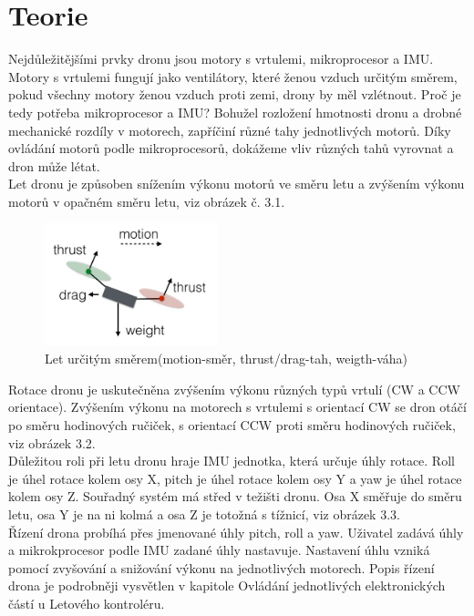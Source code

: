 \chapter{Teorie}
\label{2-teorie}

Nejdůležitějšími prvky dronu jsou motory s vrtulemi, mikroprocesor a IMU. Motory s vrtulemi fungují jako ventilátory, které ženou vzduch určitým směrem, pokud všechny motory ženou vzduch proti zemi, drony by měl vzlétnout. Proč je tedy potřeba mikroprocesor a IMU? Bohužel rozložení hmotnosti dronu a drobné mechanické rozdíly v motorech, zapříčiní různé tahy jednotlivých motorů. Díky ovládání motorů podle mikroprocesorů, dokážeme vliv různých tahů vyrovnat a dron může létat.\\
Let dronu je způsoben snížením výkonu motorů ve směru letu a zvýšením výkonu motorů v opačném směru letu, viz obrázek č. 3.1.\\
\begin{figure}[h]
	\centering
	\includegraphics[width=5cm]{pictures/dronfly.jpg}
	\caption{Let určitým směrem(motion-směr, thrust/drag-tah, weigth-váha)}
\end{figure}
 Rotace dronu je uskutečněna zvýšením výkonu různých typů vrtulí (CW a CCW orientace). Zvýšením výkonu na motorech s vrtulemi s orientací CW se dron otáčí po směru hodinových ručiček, s orientací CCW proti směru hodinových ručiček, viz obrázek 3.2.\\
Důležitou roli při letu dronu hraje IMU jednotka, která určuje úhly rotace. Roll je úhel rotace kolem osy X, pitch je úhel rotace kolem osy Y a yaw je úhel rotace kolem osy Z. Souřadný systém má střed v težišti dronu. Osa X směřuje do směru letu, osa Y je na ni kolmá a osa Z je totožná s tížnicí, viz obrázek 3.3.\\
Řízení drona probíhá přes jmenované úhly pitch, roll a yaw. Uživatel zadává úhly a mikrokprocesor podle IMU zadané úhly nastavuje. Nastavení úhlu vzniká pomocí zvyšování a snižování výkonu na jednotlivých motorech. Popis řízení drona je podrobněji vysvětlen v kapitole Ovládání jednotlivých elektronických částí u Letového kontroléru.\\
